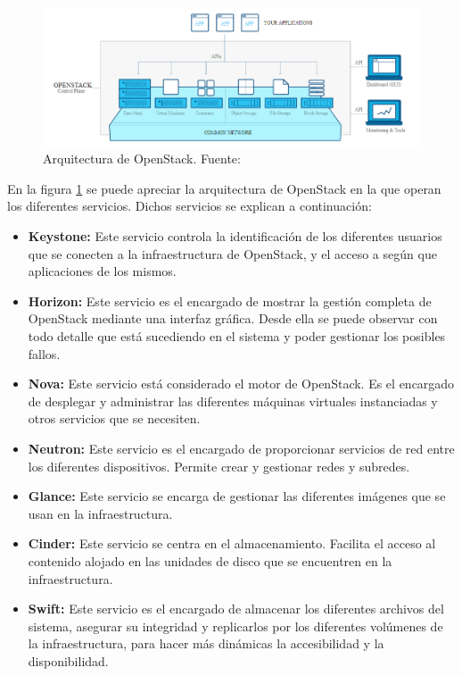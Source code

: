 \clearpage

\begin{figure}[!ht]
	\centering
	\includegraphics[width=1.1\linewidth]{imagenes/openstack_arch}
	\caption{Arquitectura de OpenStack. Fuente:\cite{openstackbib}}
	\label{fig:openstackarch}
\end{figure}

En la figura \ref{fig:openstackarch} se puede apreciar la arquitectura de OpenStack en la que operan los diferentes servicios. Dichos servicios se explican a continuación:

\begin{itemize}
	\item \textbf{Keystone:}  Este servicio controla la identificación de los diferentes usuarios que se conecten a la infraestructura de OpenStack, y el acceso a según que aplicaciones de los mismos.
	
	\item \textbf{Horizon:} Este servicio es el encargado de mostrar la gestión completa de OpenStack mediante una interfaz gráfica. Desde ella se puede observar con todo detalle que está sucediendo en el sistema y poder gestionar los posibles fallos.
	
	\item \textbf{Nova:} Este servicio está considerado el motor de OpenStack. Es el encargado de desplegar y administrar las diferentes máquinas virtuales instanciadas y otros servicios que se necesiten.
	
	\item \textbf{Neutron:} Este servicio es el encargado de proporcionar servicios de red entre los diferentes dispositivos. Permite crear y gestionar redes y subredes.
	
	\item \textbf{Glance:} Este servicio se encarga de gestionar las diferentes imágenes que se usan en la infraestructura.
	
	\item \textbf{Cinder:} Este servicio se centra en el almacenamiento. Facilita el acceso al contenido alojado en las unidades de disco que se encuentren en la infraestructura.
	
	\item \textbf{Swift:} Este servicio es el encargado de almacenar los diferentes archivos del sistema, asegurar su integridad y replicarlos por los diferentes volúmenes de la infraestructura, para hacer más dinámicas la accesibilidad y la disponibilidad.
\end{itemize}

